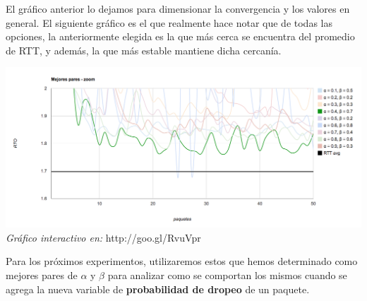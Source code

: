 El gráfico anterior lo dejamos para dimensionar la convergencia y los valores en general. El siguiente gráfico es el que realmente hace notar que de todas las opciones, la anteriormente elegida es la que más cerca se encuentra del promedio de RTT, y además, la que más estable mantiene dicha cercanía.

\begin{center}
	\includegraphics[scale=0.35]{graphics/best_pairs_zoom.png}
	\textit{Gráfico interactivo en:} http://goo.gl/RvuVpr
\end{center}

Para los próximos experimentos, utilizaremos estos que hemos determinado como mejores pares de $\alpha$ y $\beta$ para analizar como se comportan los mismos cuando se agrega la nueva variable de \textbf{probabilidad de dropeo} de un paquete.